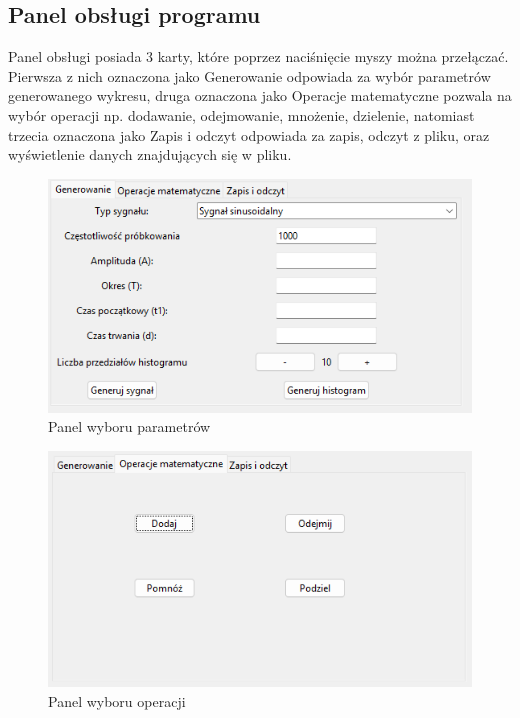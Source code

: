 \documentclass{article}
\begin{document}
\subsection{Panel obsługi programu}  


Panel obsługi posiada 3 karty, które poprzez naciśnięcie myszy można przełączać.
Pierwsza z nich oznaczona jako Generowanie odpowiada za wybór parametrów generowanego
wykresu, druga oznaczona jako Operacje matematyczne pozwala na wybór operacji np. dodawanie, odejmowanie, mnożenie,
dzielenie, natomiast trzecia oznaczona jako Zapis i odczyt odpowiada za zapis, odczyt z pliku,
oraz wyświetlenie danych znajdujących się w pliku.
\FloatBarrier
\begin{figure}[h!]
    \centering
    \includegraphics[width=\textwidth]{img/generuj.png}
    \caption{Panel wyboru parametrów}
\end{figure}
\FloatBarrier
\begin{figure}[h!]
    \centering
    \includegraphics[width=\textwidth]{img/operacje.png}
    \caption{Panel wyboru operacji}
\end{figure}
\FloatBarrier
\end{document}

